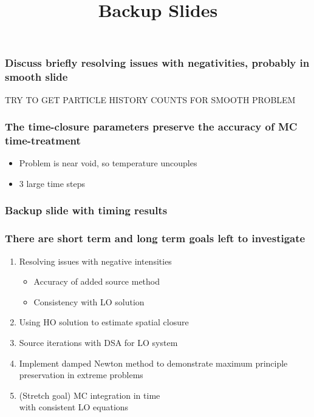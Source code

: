 \documentclass[xcolor=dvipsnames,hyperref={pdfpagelabels=false},unknownkeysallowed,
handout]{beamer}
\newcommand{\colb}[1]{{\color{blue} #1}}
\newcommand{\colG}[1]{{\color{Gray!110} #1}}
\newlength{\wideitemsep}
\let\olditem\item
\renewcommand{\item}{\setlength{\itemsep}{\wideitemsep}\olditem}
\begin{document}
\begin{frame}
    \frametitle{Discuss briefly resolving issues with negativities, probably in smooth
    slide}
    TRY TO GET PARTICLE HISTORY COUNTS FOR SMOOTH PROBLEM

\end{frame}

\begin{frame}
    \frametitle{The time-closure parameters preserve the accuracy of MC time-treatment}
    \begin{itemize}
        \item Problem is near void, so temperature uncouples
        \item 3 large time steps
    \end{itemize}
    \begin{figure}
    \end{figure}
\end{frame}

\begin{frame}
    \frametitle{Backup slide with timing results}

\end{frame}

\begin{frame}
    \frametitle{\colb{There are short term and long term goals left to investigate}}
        \begin{enumerate}
            \item Resolving issues with negative intensities\colG{
                \begin{itemize}
                    \item Accuracy of added source method
                    \item Consistency with LO solution
                \end{itemize}}
            \item Using HO solution to estimate spatial closure
            \item Source iterations with DSA for LO system
            \item Implement damped Newton method to demonstrate maximum principle preservation in
                extreme problems
            \item \colG{ (Stretch goal) MC integration in time \\ with consistent LO equations}
        \end{enumerate}
    \end{frame}

\date{}
\title{Backup Slides}
\begin{frame}
    \vspace{-0.21in}
    \titlepage \vspace{-0.2113in}
\end{frame}
\end{document}
